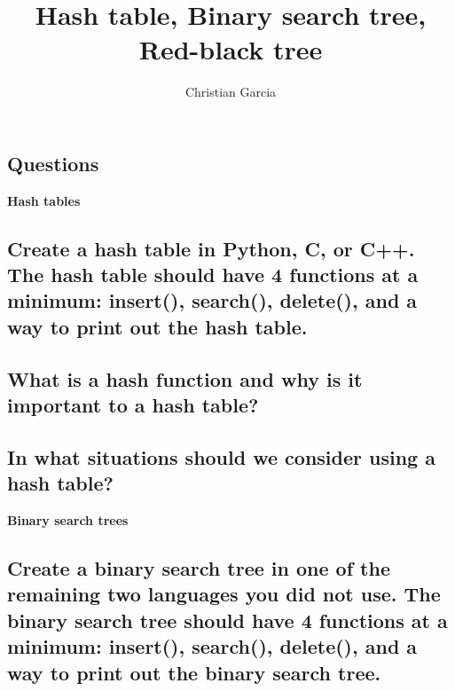 \documentclass{article}
\title{Hash table, Binary search tree, Red-black tree}
\author{Christian Garcia}
\begin{document}
\maketitle

\begin{Huge}
\section*{Questions}
\end{Huge}
\begin{itemize}
\begin{Large}
\item{\textbf{Hash tables}}
\end{Large}


\subsection{Create a hash table in Python, C, or C++. The hash table should have 4 functions at a minimum: insert(), search(), delete(), and a way to print out the hash table.}

\vspace{24pt}

\subsection{What is a hash function and why is it important to a hash table?}

\vspace{108pt}

\subsection{In what situations should we consider using a hash table?}
\pagebreak{}

\begin{Large}
\item{\textbf{Binary search trees}}
\end{Large}
\subsection{Create a binary search tree in one of the remaining two languages you did not use. The binary search tree should have 4 functions at a minimum: insert(), search(), delete(), and a way to print out the binary search tree.}

\vspace{24pt}


\end{itemize}
\end{document}
